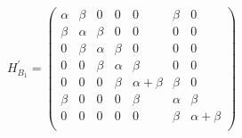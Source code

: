 \documentclass[a4paper]{book}
\newcommand{\Hp}{H^\prime}
\begin{document}
\begin{solution}
		\begin{equation*}
			\Hp_{B_1} = \begin{pmatrix}
\alpha&\beta&	0	&	0	&		0	&	\beta 	&	0	\\
\beta&\alpha&\beta	&	0	&		0	&	0	&	0	\\
0	&\beta	&\alpha	&\beta	&		0	&	0	&	0	\\
0	&	0	&\beta	&\alpha	&	\beta	&	0	&	0	\\
0	&	0	&	0	&\beta	&\alpha+\beta&	\beta	&	0\\
\beta&	0	&	0	&	0	& \beta		&	\alpha	&	\beta \\
0	&	0	&	0	&	0	&	0		&	\beta	&\alpha+\beta\\
			\end{pmatrix}					
		\end{equation*}
		
	\end{solution}
\end{document}
